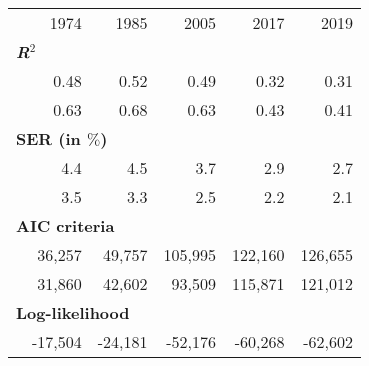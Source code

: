 
\begin{tabular}{l|ccccc}
\cline{1-6}
\multicolumn{1}{c}{} &
  \multicolumn{1}{|r}{1974} &
  \multicolumn{1}{r}{1985} &
  \multicolumn{1}{r}{2005} &
  \multicolumn{1}{r}{2017} &
  \multicolumn{1}{r}{2019} \\
\cline{1-6}
\multicolumn{6}{l}{\textbf{\textit{R}$^2$}}  \\ \hline
\multicolumn{1}{l}{\hspace{1em}{Model (A)}} &
  \multicolumn{1}{|r}{0.48} &
  \multicolumn{1}{r}{0.52} &
  \multicolumn{1}{r}{0.49} &
  \multicolumn{1}{r}{0.32} &
  \multicolumn{1}{r}{0.31} \\
\multicolumn{1}{l}{\hspace{1em}{Model (B)}} &
  \multicolumn{1}{|r}{0.63} &
  \multicolumn{1}{r}{0.68} &
  \multicolumn{1}{r}{0.63} &
  \multicolumn{1}{r}{0.43} &
  \multicolumn{1}{r}{0.41} \\ \hline
\multicolumn{6}{l}{\textbf{SER (in $\%$)}}  \\ \hline
\multicolumn{1}{l}{\hspace{1em}{Model (A)}} &
  \multicolumn{1}{|r}{4.4} &
  \multicolumn{1}{r}{4.5} &
  \multicolumn{1}{r}{3.7} &
  \multicolumn{1}{r}{2.9} &
  \multicolumn{1}{r}{2.7} \\
\multicolumn{1}{l}{\hspace{1em}{Model (B)}} &
  \multicolumn{1}{|r}{3.5} &
  \multicolumn{1}{r}{3.3} &
  \multicolumn{1}{r}{2.5} &
  \multicolumn{1}{r}{2.2} &
  \multicolumn{1}{r}{2.1} \\ \hline
\multicolumn{6}{l}{\textbf{AIC criteria}}  \\
\multicolumn{1}{l}{\hspace{1em}{Model (A)}} &
  \multicolumn{1}{|r}{36,257} &
  \multicolumn{1}{r}{49,757} &
  \multicolumn{1}{r}{105,995} &
  \multicolumn{1}{r}{122,160} &
  \multicolumn{1}{r}{126,655} \\
\multicolumn{1}{l}{\hspace{1em}{Model (B)}} &
  \multicolumn{1}{|r}{31,860} &
  \multicolumn{1}{r}{42,602} &
  \multicolumn{1}{r}{93,509} &
  \multicolumn{1}{r}{115,871} &
  \multicolumn{1}{r}{121,012} \\ \hline
\multicolumn{6}{l}{\textbf{Log-likelihood}}  \\
\multicolumn{1}{l}{\hspace{1em}{Model (A)}} &
  \multicolumn{1}{|r}{-17,504} &
  \multicolumn{1}{r}{-24,181} &
  \multicolumn{1}{r}{-52,176} &
  \multicolumn{1}{r}{-60,268} &
  \multicolumn{1}{r}{-62,602} \\

\end{tabular}
